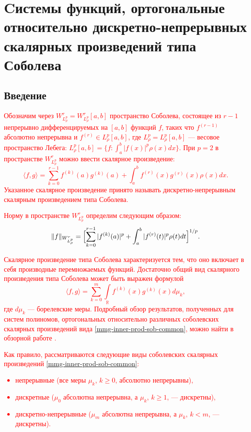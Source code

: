  \chapter{Cистемы функций, ортогональные относительно дискретно-непрерывных скалярных произведений типа Соболева}



\section*{Введение}
\textcolor{red}{Обозначим через $W^r_{L^p_\rho}=W^r_{L^p_\rho}[a,b]$ пространство Соболева, состоящее из $r-1$ непрерывно дифференцируемых на $[a,b]$ функций $f$, таких что $f^{(r-1)}$ абсолютно непрерывна и $f^{(r)} \in L^p_\rho[a,b]$, где $L^p_\rho=L^p_\rho[a,b]$ --- весовое пространство Лебега: $L^p_\rho[a,b] = \{ f: \int_a^b |f(x)|^p\rho(x)dx \}$. При $p=2$ в пространстве $W^r_{L^p_\rho}$ можно ввести скалярное произведение:
\begin{equation}\label{mmg-sob-prod}
	\langle f, g \rangle = \sum_{k=0}^{r-1}f^{(k)}(a)g^{(k)}(a)+\int_a^b f^{(r)}(x)g^{(r)}(x)\rho(x)dx.
\end{equation}
Указанное скалярное произведение принято называть дискретно-непрерывным скалярным произведением типа Соболева.}

\textcolor{red}{Норму в пространстве $W^r_{L^p_\rho}$ определим следующим образом:
\begin{equation}\label{mmg-sob-norm-def}
	\|f\|_{W^r_{L^p_\rho}} = \Bigl[
	\sum_{k=0}^{r-1}|f^{(k)}(a)|^p + \int_a^b |f^{(r)}(t)|^p \rho(t)dt
	\Bigr]^{1/p}.
\end{equation}}

\textcolor{red}{Скалярное произведение типа Соболева характеризуется тем, что оно включает в себя производные перемножаемых функций. Достаточно общий вид скалярного произведения типа Соболева может быть выражен формулой
\begin{equation}\label{mmg-inner-prod-sob-common}
	\langle f,g \rangle = \sum_{k=0}^{m}\int\limits_{\mathbb{R}}f^{(k)}(x)g^{(k)}(x)d\mu_k,
\end{equation}
где $d\mu_k$ --- борелевские меры. Подробный обзор результатов, полученных для систем полиномов, ортогональных относительно различных соболевских скалярных произведений вида \eqref{mmg-inner-prod-sob-common}, можно найти в обзорной работе \cite{mmg-MarcellanXu2015}.}

\textcolor{red}{Как правило, рассматриваются следующие виды соболевских скалярных произведений \eqref{mmg-inner-prod-sob-common}:
\begin{itemize}
	\item
	непрерывные (все меры $\mu_k$, $k \ge 0$, абсолютно непрерывны),
	\item
	дискретные ($\mu_0$ абсолютна непрерывна, а $\mu_k$, $k \ge 1$, --- дискретны),
	\item
	дискретно-непрерывные ($\mu_m$ абсолютна непрерывна, а $\mu_k$, $k < m$, --- дискретны).	
\end{itemize}}

